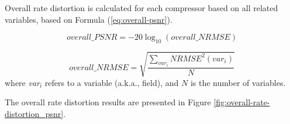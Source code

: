 
Overall rate distortion is calculated for each compressor based on all related variables, based on Formula (\ref{eq:overall-psnr}).

\def\formulaOverallPSNR{
	overall\_PSNR = -20 \log_{10}(overall\_NRMSE)
}
\begin{equation}
\label{eq:overallPSNR}
  \formulaOverallPSNR
\end{equation}

\def\formulaOverallNRMSE{
	overall\_NRMSE = \sqrt{\frac{\sum_{var_i} NRMSE^2(var_i)}{N}}
}
\begin{equation}
\label{eq:overallNRMSE}
  \formulaOverallNRMSE
\end{equation}
where \emph{var}$_i$ refers to a variable (a.k.a., field), and $N$ is the number of variables.

The overall rate distortion results are presented in Figure \ref{fig:overall-rate-distortion_psnr}.


